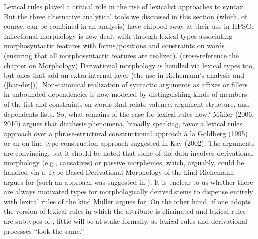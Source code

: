 \documentclass[output=paper]{langsci/langscibook}
\begin{document}
Lexical rules played a critical role in the rise of lexicalist approaches to syntax. But the three alternative analytical tools we discussed in this section (which, of course, can be combined in an analysis) have chipped away at their use in HPSG. Inflectional morphology is now dealt with through lexical types associating morphosyntactic features with forms/positions and constraints on words (ensuring that all morphosyntactic features are realized). (cross-reference the chapter on Morphology)
Derivational morphology is handled via lexical types too, but ones that add an extra internal layer (the ase in Riehemann's analysis and (\ref{bar-der})). 
Non-canonical realization of syntactic arguments as affixes or fillers in unbounded dependencies is now modeled by distinguishing kinds of members of the  list and constraints on words that relate valence, argument structure, and dependents lists. So, what remains of the case for lexical rules now? Müller (2006, 2010) argues that diathesis phenomena, broadly speaking, favor a lexical rules approach over a phrase-structural constructional approach à la Goldberg (1995) or an on-line type construction approach suggested in Kay (2002). The arguments are convincing, but it should be noted that some of the data involves derivational morphology (e.g., causatives) or passive morphemes, which, arguably, could be handled via a Type-Based Derivational Morphology of the kind Riehemann argues for (such an approach was suggested in \citet[Chapter~4]{Koenig99a}). 
It is unclear to us whether there are always motivated types for morphologically derived stems to dispense entirely with lexical rules of the kind Müller argues for. On the other hand, if one adopts the version of lexical rules in which the  attribute is eliminated and lexical rules are subtypes of , little will be at stake formally, as lexical rules and derivational processes ``look the same.'' 
\end{document}
